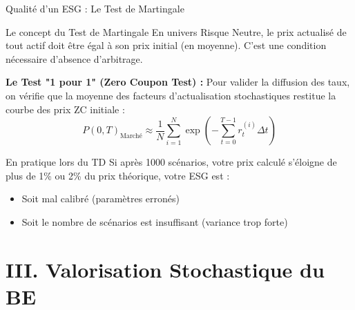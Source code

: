\documentclass[10pt,aspectratio=169,xcolor={dvipsnames}]{beamer}
\begin{document}
\begin{frame}{Qualité d'un ESG : Le Test de Martingale}
\begin{block}{Le concept du Test de Martingale}
En univers Risque Neutre, le prix actualisé de tout actif doit être égal à son prix initial (en moyenne). C'est une condition nécessaire d'absence d'arbitrage.
\end{block}

\vspace{0.3cm}
\textbf{Le Test "1 pour 1" (Zero Coupon Test) :}
Pour valider la diffusion des taux, on vérifie que la moyenne des facteurs d'actualisation stochastiques restitue la courbe des prix ZC initiale :
\[
P(0, T)_{\text{Marché}} \approx \frac{1}{N} \sum_{i=1}^{N} \exp\left(-\sum_{t=0}^{T-1} r_t^{(i)} \Delta t\right)
\]

\vspace{0.3cm}
\begin{exampleblock}{En pratique lors du TD}
Si après 1000 scénarios, votre prix calculé s'éloigne de plus de 1\% ou 2\% du prix théorique, votre ESG est :
\begin{itemize}
    \item Soit mal calibré (paramètres erronés)
    \item Soit le nombre de scénarios est insuffisant (variance trop forte)
\end{itemize}
\end{exampleblock}
\end{frame}

\section{III. Valorisation Stochastique du BE}
\end{document}
